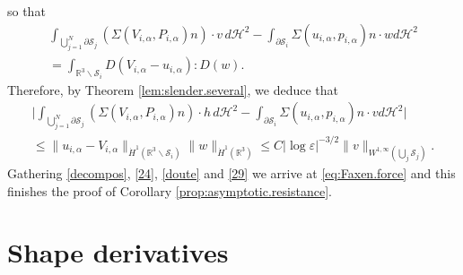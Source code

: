 \documentclass[11pt]{article}
\let\oldbigcup\bigcup
\newcommand{\R}{\mathbb{R}}
\let\eps\varepsilon
\theoremstyle{definition}
\theoremstyle{remark}
\begin{document}
so that
\begin{multline*}
\int_{\oldbigcup_{j=1}^N \partial \mathcal S_j} (\Sigma (V_{i,\alpha}, P_{i,\alpha}) n) \cdot v \, d\mathcal{H}^2
- \int_{\partial \mathcal S_i} \Sigma (u_{i,\alpha}, p_{i,\alpha}) n \cdot w {d\mathcal{H}^2}
\\[-8pt]
=\int_{\R^3 \smallsetminus \mathcal S_i } D(V_{i,\alpha} - u_{i,\alpha}) : D(w).
\end{multline*}
Therefore, by Theorem \ref{lem:slender.several}, we deduce that
\begin{multline}\label{29}
\biggl| \int_{\oldbigcup_{j=1}^N \partial \mathcal S_j} (\Sigma (V_{i,\alpha}, P_{i,\alpha}) n) \cdot h \, d\mathcal{H}^2
- \int_{\partial \mathcal S_i} \Sigma (u_{i,\alpha}, p_{i,\alpha}) n \cdot v {d\mathcal{H}^2}
\biggr| \\
\leq
\| u_{i,\alpha} - V_{i,\alpha}\|_{\dot H^1(\R^3 \smallsetminus \mathcal S_i)} \|w\|_{\dot H^1(\R^3)}
\leq C \left|\log \eps\right|^{-3/2} \|v\|_{W^{1,\infty}{(\oldbigcup_{j}\mathcal S_j)}}.
\end{multline}
Gathering
\eqref{decompos}, \eqref{24},
\eqref{doute}
and \eqref{29} we arrive at
\eqref{eq:Faxen.force} and
this finishes the proof of Corollary \ref{prop:asymptotic.resistance}.

\section{Shape derivatives}
\label{shape-derivative}
\end{document}
